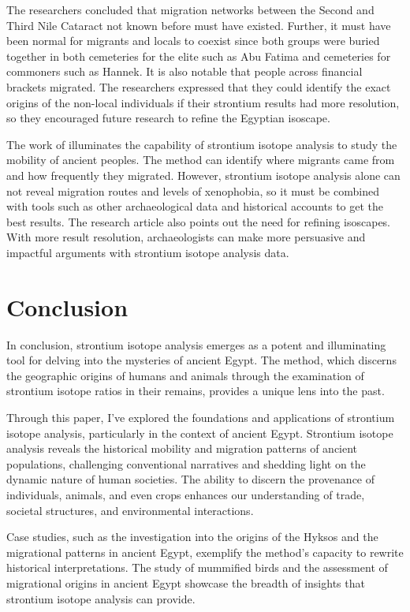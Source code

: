 \documentclass[a4paper, 12pt]{article}
\begin{document}
The researchers concluded that migration networks between the Second and Third
Nile Cataract not known before must have existed.
Further, it must have been normal
for migrants and locals to coexist since both groups were buried together in both
cemeteries for the elite such as Abu Fatima and cemeteries for commoners such
as Hannek. It is also notable that people across financial brackets migrated.
The researchers expressed that they could identify the exact origins of the non-local
individuals if their strontium results had more resolution, so they encouraged
future research to refine the Egyptian isoscape.

The work of \cite{schrader2019} illuminates the capability of strontium isotope analysis
to study the mobility of ancient peoples. The method can identify where migrants came
from and how frequently they migrated. However, strontium isotope analysis alone can
not reveal migration routes and levels of xenophobia, so it must be combined with tools such as
other archaeological data and historical accounts to get the best results. The research
article also points out the need for refining isoscapes. With more result resolution,
archaeologists can make more persuasive and impactful arguments with strontium isotope analysis data.


\section{Conclusion}
In conclusion, strontium isotope analysis emerges as a potent and illuminating
tool for delving into the mysteries of ancient Egypt. The method, which
discerns the geographic origins of humans and animals through the examination of
strontium isotope ratios in their remains, provides a unique lens into the past.

Through this paper, I've explored the foundations and applications of strontium
isotope analysis, particularly in the context of ancient Egypt. Strontium isotope
analysis reveals the historical mobility and migration patterns of ancient
populations, challenging conventional narratives and shedding light on the
dynamic nature of human societies. The ability to discern the provenance of
individuals, animals, and even crops enhances our understanding of trade,
societal structures, and environmental interactions.

Case studies, such as the investigation into the origins of the Hyksos and the
migrational patterns in ancient Egypt, exemplify the method's capacity to
rewrite historical interpretations. The study of mummified birds and the assessment of
migrational origins in
ancient Egypt showcase the breadth of insights that strontium isotope analysis
can provide.
\end{document}
